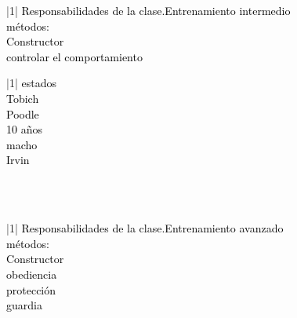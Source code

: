 \documentclass[a4paper,10pt]{article}
\begin{document}
\begin{enumerate}
\begin{enumerate}
{{{            \begin{tabular}{|1|}
                \hline
                 \textcolor{black}{Responsabilidades de la clase.Entrenamiento intermedio}\\
                \hline
                 \textcolor{black}{métodos:}\\
                \hline
                 \textcolor{black}{Constructor}\\
                \hline
                 \textcolor{black}{controlar el comportamiento  }\\
                \hline
                 \end{tabular} \hspace{1cm}     {  {\begin{tabular}{|1|}
                    \hline
                     \textcolor{black}{estados}\\
                    \hline
                     \textcolor{black}{Tobich}\\
                    \hline
                     \textcolor{black}{Poodle}\\
                    \hline
                     \textcolor{black}{10 años}\\
                    \hline
                     \textcolor{black}{macho}\\
                    \hline
                     \textcolor{black}{Irvin}\\
                    \hline
                 \end{tabular}\\\\

                 \begin{tabular}{|1|}
                    \hline
                     \textcolor{black}{Responsabilidades de la clase.Entrenamiento avanzado}\\
                    \hline
                     \textcolor{black}{métodos:}\\
                    \hline
                     \textcolor{black}{Constructor}\\
                    \hline
                     \textcolor{black}{obediencia  }\\
                    \hline
                     \textcolor{black}{protección  }\\
                    \hline
                     \textcolor{black}{guardia }\\
                    \hline
                     \end{tabular} \\  
                                  
}}}}}
\end{enumerate}
\end{enumerate}
\end{document}
